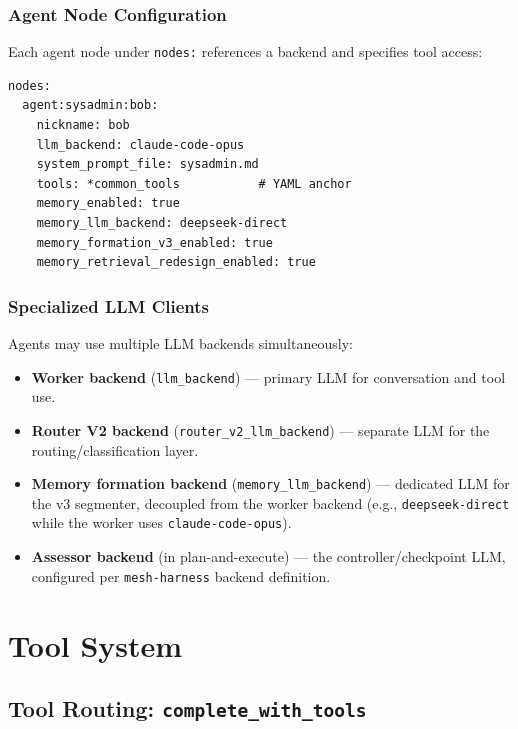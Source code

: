 \documentclass[11pt,letterpaper]{report}
\newcommand{\code}[1]{\texttt{#1}}
\begin{document}
\subsection{Agent Node Configuration}

Each agent node under \code{nodes:} references a backend and specifies
tool access:
\begin{lstlisting}
nodes:
  agent:sysadmin:bob:
    nickname: bob
    llm_backend: claude-code-opus
    system_prompt_file: sysadmin.md
    tools: *common_tools           # YAML anchor
    memory_enabled: true
    memory_llm_backend: deepseek-direct
    memory_formation_v3_enabled: true
    memory_retrieval_redesign_enabled: true
\end{lstlisting}

\subsection{Specialized LLM Clients}

Agents may use multiple LLM backends simultaneously:
\begin{itemize}[nosep]
  \item \textbf{Worker backend} (\code{llm\_backend}) ---
        primary LLM for conversation and tool use.
  \item \textbf{Router V2 backend} (\code{router\_v2\_llm\_backend}) ---
        separate LLM for the routing/classification layer.
  \item \textbf{Memory formation backend}
        (\code{memory\_llm\_backend}) --- dedicated LLM for the v3
        segmenter, decoupled from the worker backend (e.g.,
        \code{deepseek-direct} while the worker uses
        \code{claude-code-opus}).
  \item \textbf{Assessor backend} (in plan-and-execute) ---
        the controller/checkpoint LLM, configured per
        \code{mesh-harness} backend definition.
\end{itemize}


\chapter{Tool System}
\label{ch:tools}

\section{Tool Routing: \code{complete\_with\_tools}}
\label{sec:tool-routing}
\end{document}
